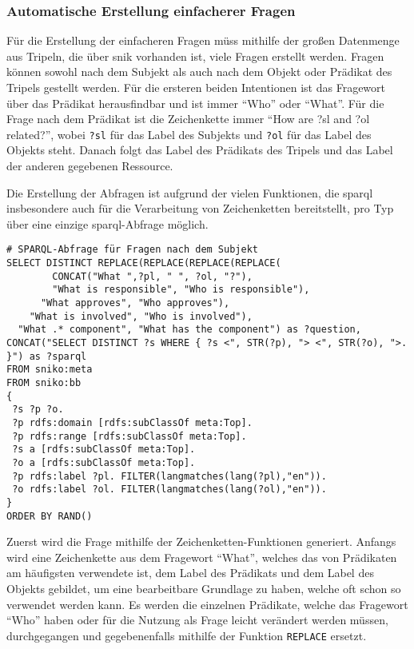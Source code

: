 \subsubsection{Automatische Erstellung einfacherer Fragen}

Für die Erstellung der einfacheren Fragen müss mithilfe der großen Datenmenge aus Tripeln, die über \ac{snik} vorhanden ist, viele Fragen erstellt werden.
Fragen können sowohl nach dem Subjekt als auch nach dem Objekt oder Prädikat des Tripels gestellt werden.
Für die ersteren beiden Intentionen ist das Fragewort über das Prädikat herausfindbar und ist immer \enquote{Who} oder \enquote{What}.
Für die Frage nach dem Prädikat ist die Zeichenkette immer \enquote{How are ?sl and ?ol related?}, wobei \texttt{?sl} für das Label des Subjekts und \texttt{?ol} für das Label des Objekts steht.
Danach folgt das Label des Prädikats des Tripels und das Label der anderen gegebenen Ressource.

Die Erstellung der Abfragen ist aufgrund der vielen Funktionen, die \ac{sparql} insbesondere auch für die Verarbeitung von Zeichenketten bereitstellt, pro Typ über eine einzige \ac{sparql}-Abfrage möglich.
\begin{lstlisting}[language=SPARQL]
# SPARQL-Abfrage für Fragen nach dem Subjekt
SELECT DISTINCT REPLACE(REPLACE(REPLACE(REPLACE(
        CONCAT("What ",?pl, " ", ?ol, "?"),
        "What is responsible", "Who is responsible"),
      "What approves", "Who approves"),
    "What is involved", "Who is involved"),
  "What .* component", "What has the component") as ?question,
CONCAT("SELECT DISTINCT ?s WHERE { ?s <", STR(?p), "> <", STR(?o), ">. }") as ?sparql
FROM sniko:meta
FROM sniko:bb
{
 ?s ?p ?o.
 ?p rdfs:domain [rdfs:subClassOf meta:Top].
 ?p rdfs:range [rdfs:subClassOf meta:Top].
 ?s a [rdfs:subClassOf meta:Top].
 ?o a [rdfs:subClassOf meta:Top].
 ?p rdfs:label ?pl. FILTER(langmatches(lang(?pl),"en")).
 ?o rdfs:label ?ol. FILTER(langmatches(lang(?ol),"en")).
}
ORDER BY RAND()
\end{lstlisting}

Zuerst wird die Frage mithilfe der Zeichenketten-Funktionen generiert.
Anfangs wird eine Zeichenkette aus dem Fragewort \enquote{What}, welches das von Prädikaten am häufigsten verwendete ist, dem Label des Prädikats und dem Label des Objekts gebildet,
um eine bearbeitbare Grundlage zu haben, welche oft schon so verwendet werden kann.
Es werden die einzelnen Prädikate, welche das Fragewort \enquote{Who} haben oder für die Nutzung als Frage leicht verändert werden müssen,
durchgegangen und gegebenenfalls mithilfe der Funktion \texttt{REPLACE} ersetzt.

